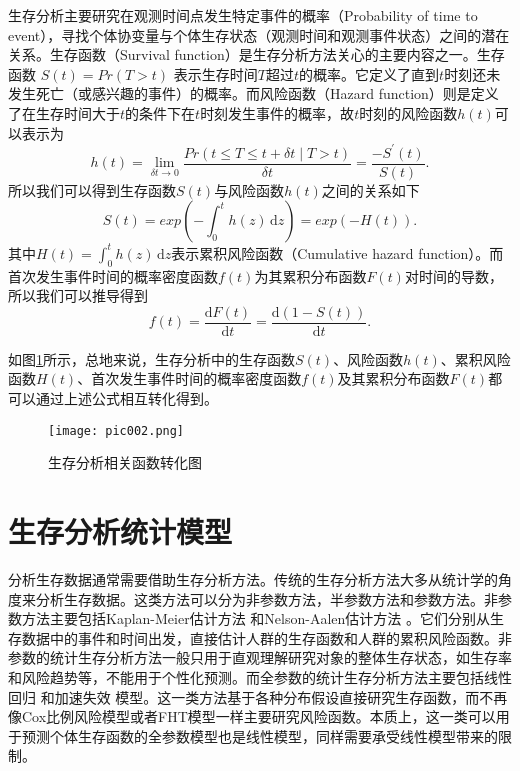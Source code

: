 生存分析主要研究在观测时间点发生特定事件的概率（Probability of time to event），寻找个体协变量与个体生存状态（观测时间和观测事件状态）之间的潜在关系。生存函数（Survival function）是生存分析方法关心的主要内容之一。生存函数 $S(t)=Pr(T>t)$ 表示生存时间$T$超过$t$的概率。它定义了直到$t$时刻还未发生死亡（或感兴趣的事件）的概率。而风险函数（Hazard function）则是定义了在生存时间大于$t$的条件下在$t$时刻发生事件的概率，故$t$时刻的风险函数$h(t)$可以表示为
\begin{equation}
h(t)=\lim_{\delta t \rightarrow 0} \frac{Pr(t \le T\le t + \delta t \mid T>t)}{\delta t}
    =\frac{-S^{'}(t)}{S(t)}. \label{F1}
\end{equation}
所以我们可以得到生存函数$S(t)$与风险函数$h(t)$之间的关系如下
\begin{equation}
S(t)=exp⁡\left(-\int_0^{t} h(z)\,\mathrm{d}z\right)=exp⁡(-H(t)). \label{F2}
\end{equation}
其中$H(t)=\int_0^{t} h(z)\,\mathrm{d}z$表示累积风险函数（Cumulative hazard function）。而首次发生事件时间的概率密度函数$f(t)$为其累积分布函数$F(t)$对时间的导数，所以我们可以推导得到
\begin{equation}
f(t)=\frac{\mathrm{d}F(t)}{\mathrm{d}t}=\frac{\mathrm{d}(1-S(t))}{\mathrm{d}t}. \label{F3}
\end{equation}

如图\ref{pic002}所示，总地来说，生存分析中的生存函数$S(t)$、风险函数$h(t)$、累积风险函数$H(t)$、首次发生事件时间的概率密度函数$f(t)$及其累积分布函数$F(t)$都可以通过上述公式相互转化得到。

\begin{figure}[H]
\texttt{[image: pic002.png]}
\caption{生存分析相关函数转化图}
\label{pic002}
\end{figure}

\section{生存分析统计模型}

分析生存数据通常需要借助生存分析方法。传统的生存分析方法大多从统计学的角度来分析生存数据。这类方法可以分为非参数方法，半参数方法和参数方法。非参数方法主要包括Kaplan-Meier估计方法  和Nelson-Aalen估计方法 。它们分别从生存数据中的事件和时间出发，直接估计人群的生存函数和人群的累积风险函数。非参数的统计生存分析方法一般只用于直观理解研究对象的整体生存状态，如生存率和风险趋势等，不能用于个性化预测。而全参数的统计生存分析方法主要包括线性回归 和加速失效 模型。这一类方法基于各种分布假设直接研究生存函数，而不再像Cox比例风险模型或者FHT模型一样主要研究风险函数。本质上，这一类可以用于预测个体生存函数的全参数模型也是线性模型，同样需要承受线性模型带来的限制。

